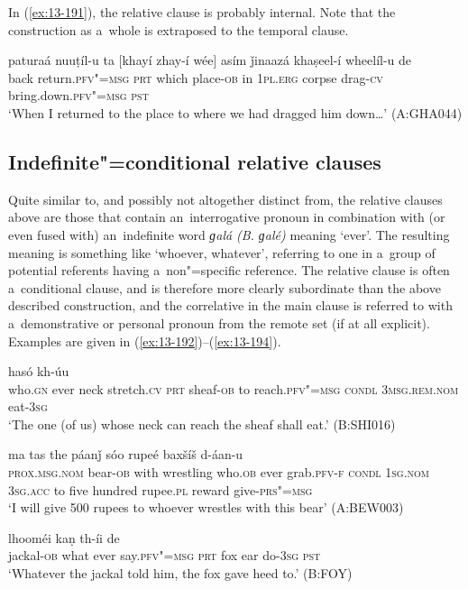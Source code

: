 In (\ref{ex:13-191}), the relative clause is probably internal. Note that the construction as a~whole is extraposed to the temporal clause.

\begin{exe}
\ex
\label{ex:13-191}
\gll paturaá nuuṭíl-u ta [khayí zhay-í wée] asím  ǰinaazá khaṣeel-í wheelíl-u de \\
back return.\textsc{pfv"=msg} \textsc{prt} which place-\textsc{ob} in \textsc{1pl.erg} corpse drag-\textsc{cv}  bring.down.\textsc{pfv"=msg} \textsc{pst}   \\
\glt `When I returned to the place to where we had dragged him down{\ldots}' (A:GHA044)
\end{exe}

\subsection{Indefinite"=conditional relative clauses}
\label{subsec:13-6-2}

Quite similar to, and possibly not altogether distinct from, the relative clauses above are those that contain an~interrogative pronoun in combination with (or even fused with) an~indefinite word \textit{ɡalá} \textit{(B. ɡalé)} meaning `ever'. The resulting meaning is something like `whoever, whatever', referring to one in a~group of potential referents having a~non"=specific reference. The relative clause is often a~conditional clause, and is therefore more clearly subordinate than the above described construction, and the correlative in the main clause is referred to with a~demonstrative or personal pronoun from the remote set (if at all explicit). Examples are given in (\ref{ex:13-192})--(\ref{ex:13-194}).

\begin{exe}
\ex
\label{ex:13-192}
 hasó kh-úu \\
who.\textsc{gn} ever neck stretch.\textsc{cv} \textsc{prt} sheaf-\textsc{ob} to  reach.\textsc{pfv"=msg} \textsc{condl} \textsc{3msg.rem.nom} eat-\textsc{3sg} \\
\glt `The one (of us) whose neck can reach the sheaf shall eat.' (B:SHI016)

\ex
\label{ex:13-193}
 ma tas
the páanǰ sóo rupeé baxšíš  d-áan-u \\
\textsc{prox.msg.nom}{\protect\footnotemark} bear-\textsc{ob} with wrestling who.\textsc{ob} ever grab.\textsc{pfv-f} \textsc{condl} \textsc{1sg.nom} \textsc{3sg.acc} to five hundred rupee.\textsc{pl} reward give-\textsc{prs"=msg} \\
\glt `I will give 500 rupees to whoever wrestles with this bear' (A:BEW003)

\ex
\label{ex:13-194}
 lhooméi kaṇ  th-íi de \\
jackal-\textsc{ob} what ever say.\textsc{pfv"=msg} \textsc{prt} fox ear do-\textsc{3sg} \textsc{pst} \\
\glt `Whatever the jackal told him, the fox gave heed to.' (B:FOY) 
\end{exe}

